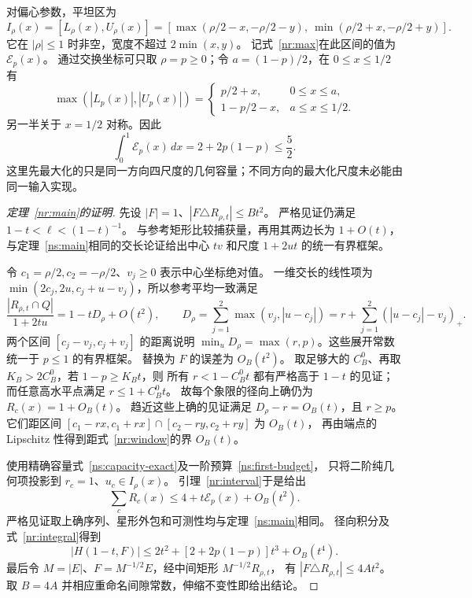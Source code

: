 对偏心参数，平坦区为
\begin{equation}\label{nr:window}
 I_\rho(x)=[L_\rho(x),U_\rho(x)]
 =[\max(\rho/2-x,-\rho/2-y),\ \min(\rho/2+x,-\rho/2+y)].
\end{equation}
它在 $|\rho|\le1$ 时非空，宽度不超过 $2\min(x,y)$。
记式~\eqref{nr:max}在此区间的值为 $\mathcal E_p(x)$。
通过交换坐标可只取 $\rho=p\ge0$；令 $a=(1-p)/2$，在 $0\le x\le1/2$ 有
\[
 \max(|L_p(x)|,|U_p(x)|)=
 \begin{cases}p/2+x,&0\le x\le a,\\1-p/2-x,&a\le x\le1/2.\end{cases}
\]
另一半关于 $x=1/2$ 对称。因此
\begin{equation}\label{nr:integral}
 \int_0^1\mathcal E_p(x)\,dx=2+2p(1-p)\le\frac52.
\end{equation}
这里先最大化的只是同一方向四尺度的几何容量；不同方向的最大化尺度未必能由同一输入实现。

\begin{proof}[定理~\ref{nr:main}的证明]
先设 $|F|=1$、$|F\triangle R_{\rho,t}|\le Bt^2$。
严格见证仍满足 $1-t<\ell<(1-t)^{-1}$。
与参考矩形比较捕获量，再用其两边长为 $1+O(t)$，
与定理~\ref{ns:main}相同的交长论证给出中心 $tv$ 和尺度 $1+2ut$ 的统一有界框架。

令 $c_1=\rho/2,c_2=-\rho/2$、$v_j\ge0$ 表示中心坐标绝对值。
一维交长的线性项为
$\min(2c_j,2u,c_j+u-v_j)$，所以参考平均一致满足
\[
 \frac{|R_{\rho,t}\cap Q|}{1+2tu}=1-tD_\rho+O(t^2),\qquad
 D_\rho=\sum_{j=1}^2\max(v_j,|u-c_j|)
       =r+\sum_{j=1}^2(|u-c_j|-v_j)_+.
\]
两个区间 $[c_j-v_j,c_j+v_j]$ 的距离说明
$\min_u D_\rho=\max(r,p)$。这些展开常数统一于 $p\le1$ 的有界框架。
替换为 $F$ 的误差为 $O_B(t^2)$。
取足够大的 $C_B^0$、再取 $K_B>2C_B^0$，若 $1-p\ge K_Bt$，则
所有 $r<1-C_B^0t$ 都有严格高于 $1-t$ 的见证；
而任意高水平点满足 $r\le1+C_B^0t$。
故每个象限的径向上确仍为 $R_c(x)=1+O_B(t)$。
趋近这些上确的见证满足 $D_\rho-r=O_B(t)$，且 $r\ge p$。
它们距区间
$[c_1-rx,c_1+rx]\cap[c_2-ry,c_2+ry]$ 为 $O_B(t)$，
再由端点的 Lipschitz 性得到距式~\eqref{nr:window}的界 $O_B(t)$。

使用精确容量式~\eqref{ns:capacity-exact}及一阶预算~\eqref{ns:first-budget}，
只将二阶纯几何项投影到 $r_c=1$、$u_c\in I_\rho(x)$。
引理~\ref{nr:interval}于是给出
\[
 \sum_cR_c(x)\le4+t\mathcal E_p(x)+O_B(t^2).
\]
严格见证取上确序列、星形外包和可测性均与定理~\ref{ns:main}相同。
径向积分及式~\eqref{nr:integral}得到
\[
 |H(1-t,F)|\le2t^2+[2+2p(1-p)]t^3+O_B(t^4).
\]
最后令 $M=|E|$、$F=M^{-1/2}E$，经中间矩形 $M^{-1/2}R_{\rho,t}$，
有 $|F\triangle R_{\rho,t}|\le4At^2$。
取 $B=4A$ 并相应重命名间隙常数，伸缩不变性即给出结论。
\end{proof}


